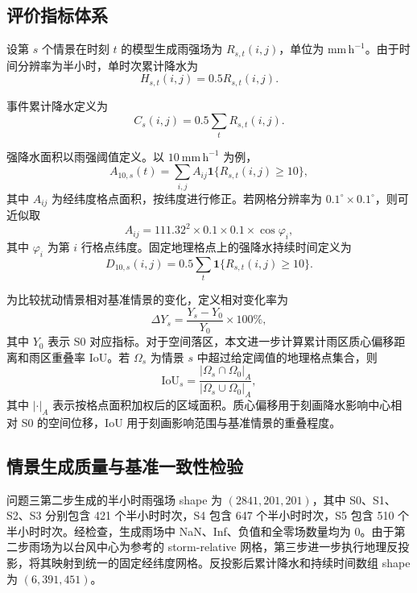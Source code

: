 \documentclass[UTF8,a4paper,zihao=5,fontset=fandol]{ctexart}
\numberwithin{equation}{section}
\numberwithin{figure}{section}
\numberwithin{table}{section}
\begin{document}
\subsection{评价指标体系}

设第 $s$ 个情景在时刻 $t$ 的模型生成雨强场为 $R_{s,t}(i,j)$，单位为 $\mathrm{mm\,h^{-1}}$。由于时间分辨率为半小时，单时次累计降水为
\begin{equation}
H_{s,t}(i,j)=0.5R_{s,t}(i,j).
\end{equation}

事件累计降水定义为
\begin{equation}
C_s(i,j)=0.5\sum_t R_{s,t}(i,j).
\end{equation}

强降水面积以雨强阈值定义。以 $10\ \mathrm{mm\,h^{-1}}$ 为例，
\begin{equation}
A_{10,s}(t)=\sum_{i,j} A_{ij}\mathbf{1}\{R_{s,t}(i,j)\ge 10\},
\end{equation}
其中 $A_{ij}$ 为经纬度格点面积，按纬度进行修正。若网格分辨率为 $0.1^\circ\times0.1^\circ$，则可近似取
\begin{equation}
A_{ij}=111.32^2\times 0.1\times 0.1\times \cos\varphi_i ,
\end{equation}
其中 $\varphi_i$ 为第 $i$ 行格点纬度。固定地理格点上的强降水持续时间定义为
\begin{equation}
D_{10,s}(i,j)=0.5\sum_t \mathbf{1}\{R_{s,t}(i,j)\ge 10\}.
\end{equation}

为比较扰动情景相对基准情景的变化，定义相对变化率为
\begin{equation}
\Delta Y_s=\frac{Y_s-Y_0}{Y_0}\times 100\%,
\end{equation}
其中 $Y_0$ 表示 S0 对应指标。对于空间落区，本文进一步计算累计雨区质心偏移距离和雨区重叠率 IoU。若 $\Omega_s$ 为情景 $s$ 中超过给定阈值的地理格点集合，则
\begin{equation}
\mathrm{IoU}_s=\frac{|\Omega_s\cap\Omega_0|_A}{|\Omega_s\cup\Omega_0|_A},
\end{equation}
其中 $|\cdot|_A$ 表示按格点面积加权后的区域面积。质心偏移用于刻画降水影响中心相对 S0 的空间位移，IoU 用于刻画影响范围与基准情景的重叠程度。

\subsection{情景生成质量与基准一致性检验}

问题三第二步生成的半小时雨强场 shape 为 $(2841,201,201)$，其中 S0、S1、S2、S3 分别包含 421 个半小时时次，S4 包含 647 个半小时时次，S5 包含 510 个半小时时次。经检查，生成雨场中 NaN、Inf、负值和全零场数量均为 0。由于第二步雨场为以台风中心为参考的 storm-relative 网格，第三步进一步执行地理反投影，将其映射到统一的固定经纬度网格。反投影后累计降水和持续时间数组 shape 为 $(6,391,451)$。
\end{document}
